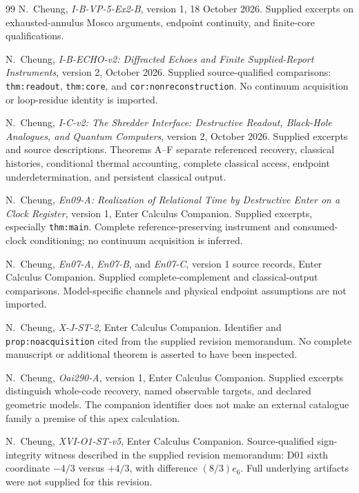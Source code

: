 \documentclass[11pt,a4paper]{article}
\newcommand{\loc}[1]{\nolinkurl{#1}}
\theoremstyle{plain}
\theoremstyle{definition}
\theoremstyle{remark}
\numberwithin{equation}{section}
\begin{document}
\begin{thebibliography}{99}
\ddag N.~Cheung,
\emph{I-B-VP-5-Ex2-B},
version 1, 18 October 2026.
Supplied excerpts on exhausted-annulus Mosco arguments,
endpoint continuity, and finite-core qualifications.

\ddag N.~Cheung,
\emph{I-B-ECHO-v2: Diffracted Echoes and Finite Supplied-Report
Instruments},
version 2, October 2026.
Supplied source-qualified comparisons:
\loc{thm:readout}, \loc{thm:core},
and \loc{cor:nonreconstruction}.
No continuum acquisition or loop-residue identity is imported.

\ddag N.~Cheung,
\emph{I-C-v2: The Shredder Interface:
Destructive Readout, Black-Hole Analogues, and Quantum Computers},
version 2, October 2026.
Supplied excerpts and source descriptions.
Theorems A--F separate referenced recovery, classical histories,
conditional thermal accounting, complete classical access,
endpoint underdetermination, and persistent classical output.

\ddag N.~Cheung,
\emph{En09-A: Realization of Relational Time by Destructive Enter
on a Clock Register},
version 1, Enter Calculus Companion.
Supplied excerpts, especially \loc{thm:main}.
Complete reference-preserving instrument and consumed-clock
conditioning; no continuum acquisition is inferred.

\ddag N.~Cheung,
\emph{En07-A}, \emph{En07-B}, and \emph{En07-C},
version 1 source records, Enter Calculus Companion.
Supplied complete-complement and classical-output comparisons.
Model-specific channels and physical endpoint assumptions are
not imported.

\ddag N.~Cheung,
\emph{X-J-ST-2},
Enter Calculus Companion.
Identifier and \loc{prop:noacquisition} cited from the supplied
revision memorandum. No complete manuscript or additional
theorem is asserted to have been inspected.

\ddag N.~Cheung,
\emph{Oai290-A},
version 1, Enter Calculus Companion.
Supplied excerpts distinguish whole-code recovery, named
observable targets, and declared geometric models.
The companion identifier does not make an external catalogue
family a premise of this apex calculation.

\ddag N.~Cheung,
\emph{XVI-O1-ST-v5},
Enter Calculus Companion.
Source-qualified sign-integrity witness described in the
supplied revision memorandum:
D01 sixth coordinate \(-4/3\) versus \(+4/3\), with
difference \((8/3)e_6\).
Full underlying artifacts were not supplied for this revision.


\end{thebibliography}
\end{document}
